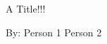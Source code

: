 \documentclass[a4paper,12pt]{article}
\begin{document}
\center
\Large 
A Title!!!

\large
By:
Person 1
Person 2
\end{document}
